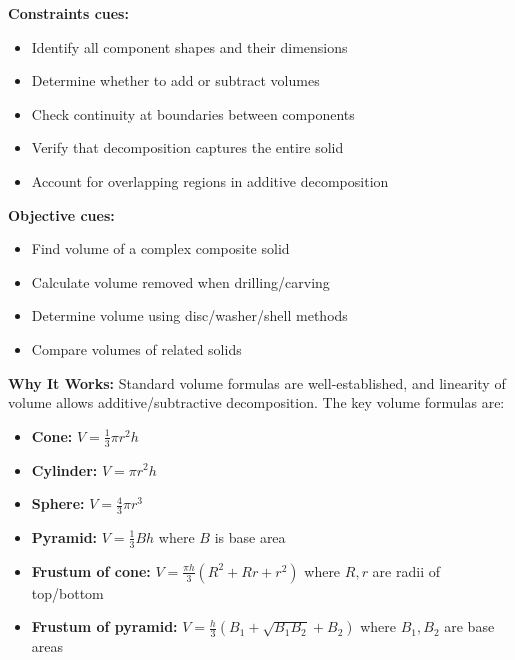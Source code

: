 \documentclass[12pt]{article}
\begin{document}
\textbf{Constraints cues:}
\begin{itemize}
    \item Identify all component shapes and their dimensions
    \item Determine whether to add or subtract volumes
    \item Check continuity at boundaries between components
    \item Verify that decomposition captures the entire solid
    \item Account for overlapping regions in additive decomposition
\end{itemize}

\textbf{Objective cues:}
\begin{itemize}
    \item Find volume of a complex composite solid
    \item Calculate volume removed when drilling/carving
    \item Determine volume using disc/washer/shell methods
    \item Compare volumes of related solids
\end{itemize}

\textbf{Why It Works:} Standard volume formulas are well-established, and linearity of volume allows additive/subtractive decomposition. The key volume formulas are:
\begin{itemize}
    \item \textbf{Cone:} $V = \frac{1}{3}\pi r^2 h$
    \item \textbf{Cylinder:} $V = \pi r^2 h$
    \item \textbf{Sphere:} $V = \frac{4}{3}\pi r^3$
    \item \textbf{Pyramid:} $V = \frac{1}{3}Bh$ where $B$ is base area
    \item \textbf{Frustum of cone:} $V = \frac{\pi h}{3}(R^2 + Rr + r^2)$ where $R, r$ are radii of top/bottom
    \item \textbf{Frustum of pyramid:} $V = \frac{h}{3}(B_1 + \sqrt{B_1B_2} + B_2)$ where $B_1, B_2$ are base areas
\end{itemize}
\end{document}
